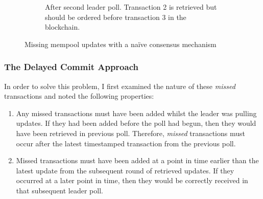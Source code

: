 \documentclass[12pt,a4paper,twoside,openright]{report}
\begin{document}
\begin{figure}
\begin{subfigure}[t]{0.40\textwidth}
			\caption{After second leader poll. Transaction 2 is retrieved but should be ordered before transaction 3 in the blockchain.}
		\end{subfigure}
		\caption{Missing mempool updates with a na\"{i}ve consensus mechanism}	
		\label{fig:readremotepartudpatesbroke}
	\end{figure}
	\subsubsection*{The Delayed Commit Approach}
	In order to solve this problem, I first examined the nature of these \textit{missed} transactions and noted the following properties:
	\begin{enumerate}
		\item Any missed transactions must have been added whilst the leader was pulling updates. 
		If they had been added before the poll had begun, then they would have been retrieved in previous poll. 
		Therefore, \textit{missed} transactions must occur after the latest timestamped transaction from the previous poll. 
		\item Missed transactions must have been added at a point in time earlier than the latest update from the subsequent round of retrieved updates.
		If they occurred at a later point in time, then they would be correctly received in that subsequent leader poll.
	\end{enumerate}
\end{document}

